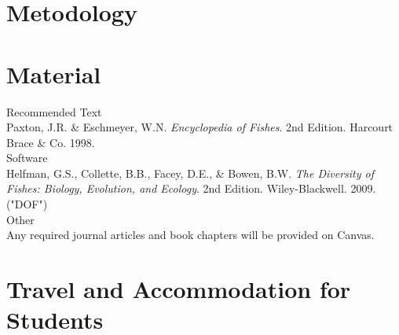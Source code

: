 \documentclass[letterpaper]{inzane_syllabus} %
\begin{document}
\vspace{0.5cm} %
\section{Metodology}

\lipsum[1]


\newpage %

\makeSide %


\vspace{0.5cm} %
\section{Material}

{\color{myCOLOR} Recommended Text}\\
Paxton, J.R. \& Eschmeyer, W.N. \textit{Encyclopedia of Fishes}. 2nd Edition. Harcourt Brace \& Co. 1998. \\

{\color{myCOLOR} Software}\\
Helfman, G.S., Collette, B.B., Facey, D.E., \& Bowen, B.W. \textit{The Diversity of Fishes: Biology, Evolution, and Ecology}. 2nd Edition. Wiley-Blackwell. 2009. ("DOF") \\


{\color{myCOLOR} Other}\\
Any required journal articles and book chapters will be provided on Canvas. 

\vspace{0.5cm}
\section{Travel and Accommodation for Students}
\end{document}
